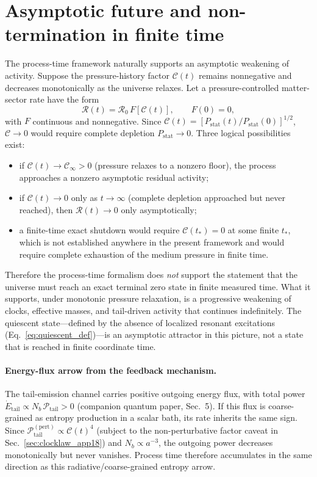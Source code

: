 \documentclass[11pt]{article}
\begin{document}
\section{Asymptotic future and non-termination in finite time}
\label{sec:asymptotic_app18}

The process-time framework naturally supports an asymptotic weakening of
activity.  Suppose the pressure-history factor $\mathcal{C}(t)$ remains
nonnegative and decreases monotonically as the universe relaxes.  Let a
pressure-controlled matter-sector rate have the form
\begin{equation}
  \mathcal{R}(t) = \mathcal{R}_0\,F[\mathcal{C}(t)],
  \qquad F(0)=0,
  \label{eq:Rfuture_app18}
\end{equation}
with $F$ continuous and nonnegative.  Since
$\mathcal{C}(t)=[P_{\mathrm{stat}}(t)/P_{\mathrm{stat}}(0)]^{1/2}$,
$\mathcal{C}\to 0$ would require complete depletion
$P_{\mathrm{stat}}\to 0$.  Three logical possibilities exist:
\begin{itemize}
\item if $\mathcal{C}(t)\to \mathcal{C}_\infty>0$ (pressure relaxes to a
  nonzero floor), the process approaches a nonzero asymptotic residual
  activity;
\item if $\mathcal{C}(t)\to 0$ only as $t\to\infty$ (complete depletion
  approached but never reached), then
  $\mathcal{R}(t)\to 0$ only asymptotically;
\item a finite-time exact shutdown would require
  $\mathcal{C}(t_\ast)=0$ at some finite $t_\ast$, which is not established
  anywhere in the present framework and would require complete exhaustion
  of the medium pressure in finite time.
\end{itemize}

Therefore the process-time formalism does \emph{not} support the statement
that the universe must reach an exact terminal zero state in finite
measured time.  What it supports, under monotonic pressure relaxation, is a
progressive weakening of clocks, effective masses, and tail-driven activity
that continues indefinitely.  The quiescent state---defined by the absence
of localized resonant excitations (Eq.~\ref{eq:quiescent_def})---is an
asymptotic attractor in this picture, not a state that is reached in
finite coordinate time.

\paragraph{Energy-flux arrow from the feedback mechanism.}
The tail-emission channel carries positive outgoing energy flux,
with total power
$\dot E_{\mathrm{tail}}\propto N_b\,\mathcal{P}_{\mathrm{tail}}>0$
(companion quantum paper, Sec.~5).  If this flux is coarse-grained
as entropy production in a scalar bath, its rate inherits the same
sign.  Since
$\mathcal{P}_{\mathrm{tail}}^{(\mathrm{pert})}\propto\mathcal{C}(t)^4$
(subject to the non-perturbative factor caveat in
Sec.~\ref{sec:clocklaw_app18}) and
$N_b\propto a^{-3}$, the outgoing power decreases monotonically but
never vanishes.  Process time therefore accumulates in the same
direction as this radiative/coarse-grained entropy arrow.
\end{document}
